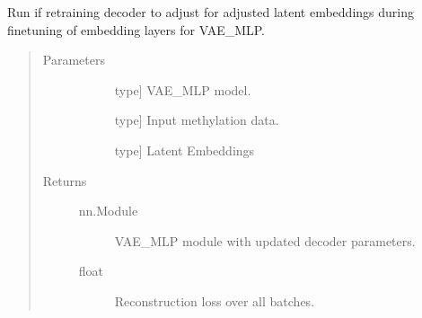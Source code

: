 \documentclass[letterpaper,10pt,english]{sphinxmanual}
\begin{document}
\begin{fulllineitems}
\label{\detokenize{index:methylnet.models.train_decoder_}}
Run if retraining decoder to adjust for adjusted latent embeddings during finetuning of embedding layers for VAE\_MLP.
\begin{quote}\begin{description}
\item[{Parameters}] \leavevmode\begin{description}
\item[{}] \leavevmode{[}type{]}
VAE\_MLP model.

\item[{}] \leavevmode{[}type{]}
Input methylation data.

\item[{}] \leavevmode{[}type{]}
Latent Embeddings

\end{description}

\item[{Returns}] \leavevmode\begin{description}
\item[{nn.Module}] \leavevmode
VAE\_MLP module with updated decoder parameters.

\item[{float}] \leavevmode
Reconstruction loss over all batches.

\end{description}

\end{description}\end{quote}

\end{fulllineitems}

\end{document}

